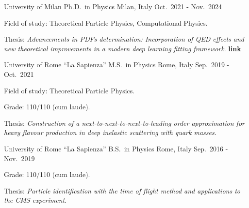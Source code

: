 

\begin{cventries}

    \cventry
        {University of Milan} %
        {Ph.D.\ in Physics} %
        {Milan, Italy} %
        {Oct.\ 2021 - Nov.\ 2024} %
        {
        \begin{cvitems} %
            \item Field of study: Theoretical Particle Physics, Computational Physics.
            \item Thesis: \emph{Advancements in PDFs determination: Incorporation of QED effects and new theoretical improvements in a modern deep learning fitting framework}. \href{https://hdl.handle.net/2434/1115085}{\textcolor{awesome}{{\textbf{link}}}}
        \end{cvitems}
        }

    \cventry
        {University of Rome ``La Sapienza''} %
        {M.S.\ in Physics} %
        {Rome, Italy} %
        {Sep.\ 2019 - Oct.\ 2021} %
        {
        \begin{cvitems} %
            \item Field of study: Theoretical Particle Physics.
            \item Grade: 110/110 (cum laude).
            \item Thesis: \emph{Construction of a next-to-next-to-next-to-leading order approximation for heavy flavour production in deep inelastic scattering with quark masses}. \href{https://inspirehep.net/literature/2750247}{\inspire}
        \end{cvitems}
        }

    \cventry
        {University of Rome ``La Sapienza''} %
        {B.S.\ in Physics} %
        {Rome, Italy} %
        {Sep.\ 2016 - Nov.\ 2019} %
        {
        \begin{cvitems} %
            \item Grade: 110/110 (cum laude).
            \item Thesis: \emph{Particle identification with the time of flight method and applications to the CMS experiment}.
        \end{cvitems}
        }

\end{cventries}